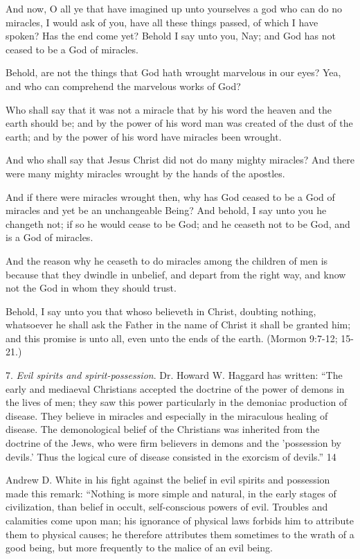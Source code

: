 And now, O all ye that have imagined up unto yourselves a god who can do no miracles, I
would ask of you, have all these things passed, of which I have spoken? Has the end come
yet? Behold I say unto you, Nay; and God has not ceased to be a God of miracles.

Behold, are not the things that God hath wrought marvelous in our eyes? Yea, and who can
comprehend the marvelous works of God?

Who shall say that it was not a miracle that by his word the heaven and the earth should be;
and by the power of his word man was created of the dust of the earth; and by the power of
his word have miracles been wrought.

And who shall say that Jesus Christ did not do many mighty miracles? And there were many
mighty miracles wrought by the hands of the apostles.

And if there were miracles wrought then, why has God ceased to be a God of miracles and
yet be an unchangeable Being? And behold, I say unto you he changeth not; if so he would
cease to be God; and he ceaseth not to be God, and is a God of miracles.

And the reason why he ceaseth to do miracles among the children of men is because that they
dwindle in unbelief, and depart from the right way, and know not the God in whom they
should trust.

Behold, I say unto you that whoso believeth in Christ, doubting nothing, whatsoever he shall
ask the Father in the name of Christ it shall be granted him; and this promise is unto all, even
unto the ends of the earth. (Mormon 9:7-12; 15-21.)

7. \textit{Evil spirits and spirit-possession}. Dr. Howard W. Haggard has written: ``The early and
mediaeval Christians accepted the doctrine of the power of demons in the lives of men; they
saw this power particularly in the demoniac production of disease. They believe in miracles
and especially in the miraculous healing of disease. The demonological belief of the
Christians was inherited from the doctrine of the Jews, who were firm believers in demons
and the 'possession by devils.' Thus the logical cure of disease consisted in the exorcism of
devils.'' 14

Andrew D. White in his fight against the belief in evil spirits and possession made this
remark: ``Nothing is more simple and natural, in the early stages of civilization, than belief in
occult, self-conscious powers of evil. Troubles and calamities come upon man; his ignorance
of physical laws forbids him to attribute them to physical causes; he therefore attributes them
sometimes to the wrath of a good being, but more frequently to the malice of an evil being.

